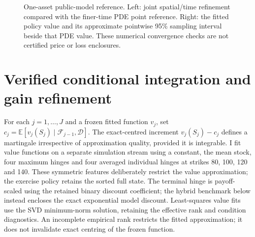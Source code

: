 \documentclass[11pt]{article}
\newcommand{\E}{\mathbb E}
\newcommand{\F}{\mathcal F}
\begin{document}
\begin{figure}[!htb]
\centering
{}
\caption{One-asset public-model reference. Left: joint spatial/time refinement compared with the finer-time PDE point reference. Right: the fitted policy value and its approximate pointwise 95\% sampling interval beside that PDE value. These numerical convergence checks are not certified price or loss enclosures.}
\label{fig:revision-pde-reference}
\end{figure}

\section{Verified conditional integration and gain refinement}
\label{sec:certification}

For each $j=1,\ldots,J$ and a frozen fitted function $v_j$, set $c_j=\E[v_j(S_j)\mid\F_{j-1},\mathcal D]$. The exact-centred increment $v_j(S_j)-c_j$ defines a martingale irrespective of approximation quality, provided it is integrable. I fit value functions on a separate simulation stream using a constant, the mean stock, four maximum hinges and four averaged individual hinges at strikes 80, 100, 120 and 140. These symmetric features deliberately restrict the value approximation; the exercise policy retains the sorted full state. The terminal hinge is payoff-scaled using the retained binary discount coefficient; the hybrid benchmark below instead encloses the exact exponential model discount. Least-squares value fits use the SVD minimum-norm solution, retaining the effective rank and condition diagnostics. An incomplete empirical rank restricts the fitted approximation; it does not invalidate exact centring of the frozen function.
\end{document}

